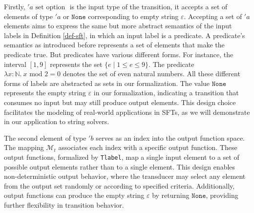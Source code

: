 \documentclass[a4paper,UKenglish,cleveref, autoref, anonymous, thm-restate]{lipics-v2021}
\begin{document}
Firstly, $'a \text{ set option }$ is the input type of the transition, it accepts a set of elements of type $'a$ or $\texttt{None}$ corresponding to empty string $\varepsilon$. 
Accepting a set of $'a$ elements aims to express the same but more abstract semantics of the input labels in Definition \ref{def-sft}, in which an input label is a predicate. A predicate's semantics as introduced before represents a set of elements that make the predicate true. But predicates have various different forms. For instance, the interval $[1, 9]$ represents the set $\{e \mid 1 \leq e \leq 9\}$. The predicate $\lambda x \colon \mathbb{N}.~ x \text{ mod } 2 = 0$ denotes the set of even natural numbers. All these different forms of labels are abstracted as sets in our formalization.
%
The value $\texttt{None}$ represents the empty string $\varepsilon$ in our formalization, indicating a transition that consumes no input but may still produce output elements. This design choice facilitates the modeling of real-world applications in SFTs, as we will demonstrate in our application to string solvers.

The second element of type $'b$ serves as an index into the output function space. The mapping $\mathcal{M}_t$ associates each index with a specific output function. These output functions, formalized by \texttt{Tlabel}, map a single input element to a set of possible output elements rather than to a single element. This design enables non-deterministic output behavior, where the transducer may select any element from the output set randomly or according to specified criteria. Additionally, output functions can produce the empty string $\varepsilon$ by returning $\texttt{None}$, providing further flexibility in transition behavior.

\end{document}
